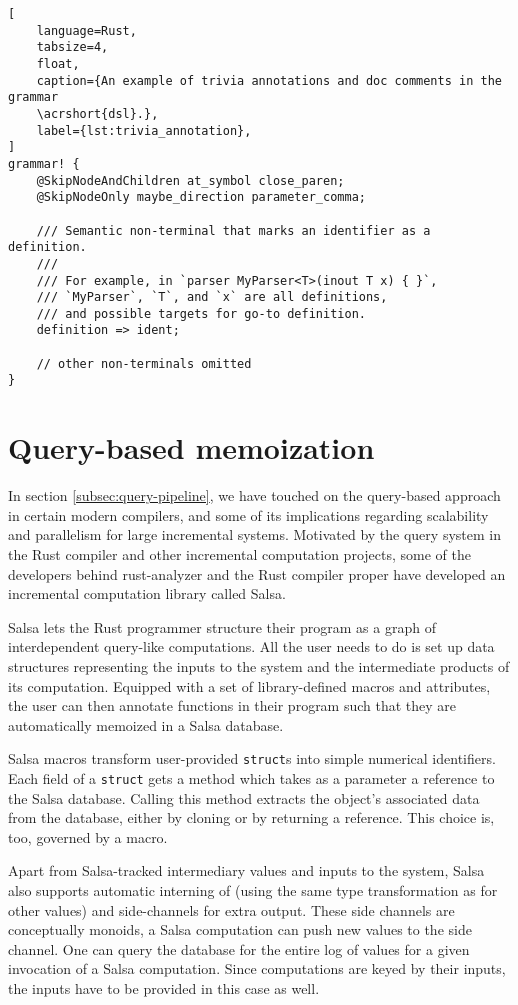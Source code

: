 \begin{lstlisting}[
	language=Rust,
	tabsize=4,
	float,
	caption={An example of trivia annotations and doc comments in the grammar
	\acrshort{dsl}.},
	label={lst:trivia_annotation},
]
grammar! {
	@SkipNodeAndChildren at_symbol close_paren;
	@SkipNodeOnly maybe_direction parameter_comma;

	/// Semantic non-terminal that marks an identifier as a definition.
	///
	/// For example, in `parser MyParser<T>(inout T x) { }`,
	/// `MyParser`, `T`, and `x` are all definitions,
	/// and possible targets for go-to definition.
	definition => ident;

	// other non-terminals omitted
}
\end{lstlisting}

\section{Query-based memoization}

In section \ref{subsec:query-pipeline}, we have touched on the query-based
approach in certain modern compilers, and some of its implications regarding
scalability and parallelism for large incremental systems. Motivated by the
query system in the Rust compiler and other incremental computation projects,
some of the developers behind rust-analyzer and the Rust compiler proper have
developed an incremental computation library called Salsa.

Salsa lets the Rust programmer structure their program as a graph of
interdependent query-like computations. All the user needs to do is set up data
structures representing the inputs to the system and the intermediate products
of its computation. Equipped with a set of library-defined macros and
attributes, the user can then annotate functions in their program such that they
are automatically memoized in a Salsa database.

Salsa macros transform user-provided \texttt{struct}s into simple numerical
identifiers. Each field of a \texttt{struct} gets a method which takes as a
parameter a reference to the Salsa database. Calling this method extracts the
object's associated data from the database, either by cloning or by returning a
reference. This choice is, too, governed by a macro.

Apart from Salsa-tracked intermediary values and inputs to the system, Salsa
also supports automatic interning of (using the same type transformation as for
other values) and side-channels for extra output. These side channels are
conceptually monoids, a Salsa computation can push new values to the side
channel. One can query the database for the entire log of values for a given
invocation of a Salsa computation. Since computations are keyed by their inputs,
the inputs have to be provided in this case as well.

